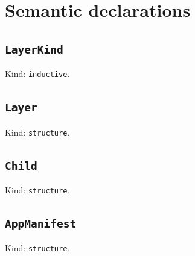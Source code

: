 \documentclass[11pt]{article}
\begin{document}
\section*{Semantic declarations}
\subsection*{\texttt{LayerKind}}
\noindent Kind: \texttt{inductive}.\par
\subsection*{\texttt{Layer}}
\noindent Kind: \texttt{structure}.\par
\subsection*{\texttt{Child}}
\noindent Kind: \texttt{structure}.\par
\subsection*{\texttt{AppManifest}}
\noindent Kind: \texttt{structure}.\par
\end{document}
